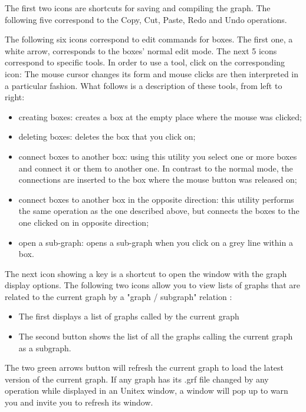 \medskip
{}
\noindent The first two icons are shortcuts for saving and compiling the graph.
The following five correspond to the Copy, Cut, Paste, Redo and Undo operations. 

\bigskip
\noindent The following six icons correspond to edit commands for boxes. The first
one, a white arrow, corresponds to the boxes' normal edit mode. The next 5 icons
correspond to specific tools. In order to use a tool, click on the
corresponding icon: The mouse cursor changes its form and mouse clicks are then
interpreted in a particular fashion. What follows is a description of these
tools, from left to right:

\begin{itemize}
  \item creating boxes: creates a box at the empty place where the mouse was clicked;
  \item deleting boxes: deletes the box that you click on;
  \item connect boxes to another box: using this utility you select one or
  more boxes and connect it or them to another one. In contrast to the
  normal mode, the connections are inserted to the box where the mouse button
  was released on;
  \item connect boxes to another box in the opposite direction: this utility
  performs the same operation as the one described above, but connects the boxes
  to the one clicked on in opposite direction;
  \item open a sub-graph: opens a sub-graph when you click on a grey line within a box.
\end{itemize}
The next icon showing a key is a shortcut to open the window with the graph display
options.
The following two icons allow you to view lists of graphs that are related to the current graph by a  "graph / subgraph" relation :
\begin{itemize}
\item The first displays a list of graphs called by the current graph
\item The second button shows the list of all the graphs calling the current graph as a subgraph.
\end{itemize}
The two green arrows button will refresh the current graph to load the latest version of the current graph. If any graph has its .grf file changed by any operation while displayed in an Unitex window, a window will pop up to warn you and invite you to refresh its window.

